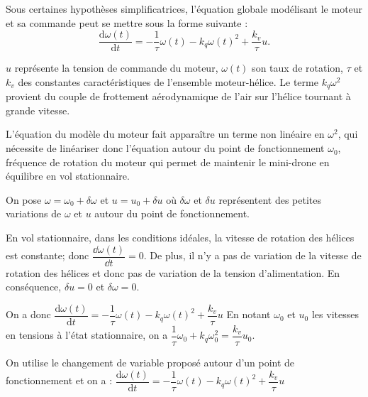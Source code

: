 \begin{multicols}{2}
Sous certaines hypothèses simplificatrices, l'équation globale modélisant le moteur et sa commande peut se
mettre sous la forme suivante :
$$
\dfrac{\text{d}\omega(t)}{\text{d}t}=-\dfrac{1}{\tau}\omega(t) -k_q\omega(t)^2 + \dfrac{k_v}{\tau}u.
$$

$u$ représente la tension de commande du moteur, $\omega(t)$ son taux de rotation, $\tau$ et $k_v$ des constantes caractéristiques de l'ensemble moteur-hélice. Le terme $k_q\omega^2$ provient du couple de frottement aérodynamique de l'air sur l'hélice tournant à grande vitesse.

L'équation du modèle du moteur fait apparaître un terme non linéaire en $\omega^2$, qui nécessite de linéariser
donc l'équation autour du point de fonctionnement $\omega_0$, fréquence de rotation du moteur qui permet de
maintenir le mini-drone en équilibre en vol stationnaire.

On pose $\omega=\omega_0+\delta \omega$ et $u=u_0+\delta u$ où $\delta\omega$ et $\delta u$ représentent des petites variations de $\omega$ et $u$ autour du point de fonctionnement.
\fi

\ifprof
\begin{corrige}
En vol stationnaire, dans les conditions idéales, la vitesse de rotation des hélices est constante; donc $\dfrac{\dd \omega(t)}{\dd t} = 0$. De plus, il n'y a pas de variation de la vitesse de rotation des hélices et donc pas de variation de la tension d'alimentation. En conséquence, $\delta u =0$ et $\delta \omega = 0$.

On a donc 
$
\dfrac{\text{d}\omega(t)}{\text{d}t}=-\dfrac{1}{\tau}\omega(t) -k_q\omega(t)^2 + \dfrac{k_v}{\tau}u $ 
En notant $\omega_0$ et $u_0$ les vitesses en tensions à l'état stationnaire, on a 
$\dfrac{1}{\tau}\omega_0 +k_q\omega_0^2 = \dfrac{k_v}{\tau}u_0$.

\end{corrige}
\else
\fi

\ifprof
\begin{corrige}
On utilise le changement de variable proposé autour d'un point de fonctionnement et on a : 
$
\dfrac{\text{d}\omega(t)}{\text{d}t}=-\dfrac{1}{\tau}\omega(t) -k_q\omega(t)^2 + \dfrac{k_v}{\tau}u
$


\end{corrige}
\end{multicols}
